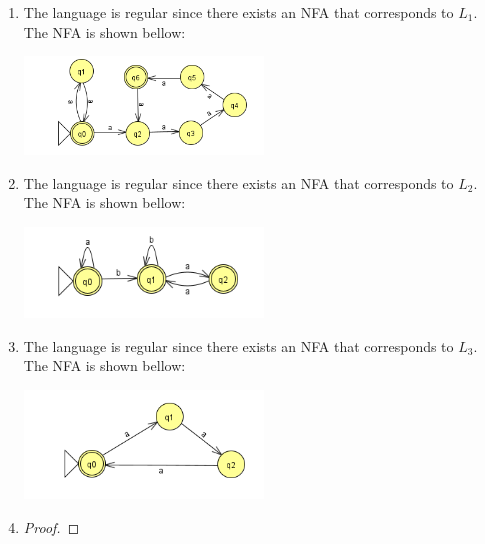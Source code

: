 \begin{enumerate}[label={(\alph*)}]
    \item The language is regular since there exists an NFA that corresponds to $L_1$. The NFA is shown bellow:
    \begin{center}
        \includegraphics[width=0.5\textwidth]{img/graph6.png}
    \end{center}
    \item The language is regular since there exists an NFA that corresponds to $L_2$. The NFA is shown bellow:
    \begin{center}
        \includegraphics[width=0.5\textwidth]{img/graph7.png}
    \end{center}
    \item The language is regular since there exists an NFA that corresponds to $L_3$. The NFA is shown bellow:
    \begin{center}
        \includegraphics[width=0.5\textwidth]{img/graph8.png}
    \end{center}
    \item
        \begin{proof}
            
        \end{proof}
\end{enumerate}